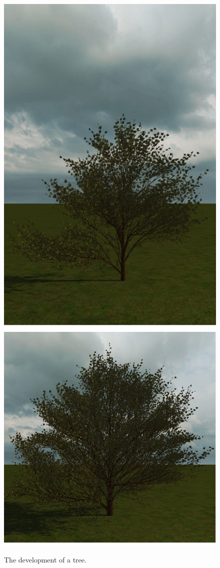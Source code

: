 \documentclass{article}
\begin{document}
\begin{figure}[ht!]
  			\includegraphics[scale=0.25]{treegrowth2}
  			\includegraphics[scale=0.25]{treegrowth3}

  			\caption{The development of a tree.}
  			\label{fig:treegrowth}
  		\end{figure}
  	
\end{document}
